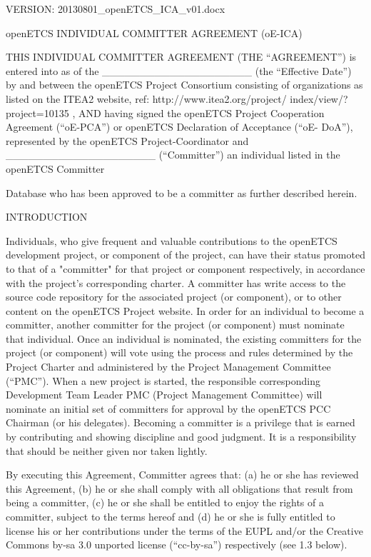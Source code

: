 VERSION: 20130801\_openETCS\_ICA\_v01.docx

openETCS INDIVIDUAL COMMITTER AGREEMENT (oE-ICA)

THIS INDIVIDUAL COMMITTER AGREEMENT (THE “AGREEMENT”) is entered into as of
the \_\_\_\_\_\_\_\_\_\_\_\_\_\_\_\_\_\_\_\_ (the “Effective Date”) by and between the openETCS Project
Consortium consisting of organizations as listed on the ITEA2 website, ref:
http://www.itea2.org/project/ index/view/?project=10135 , AND having signed the openETCS
Project Cooperation Agreement (“oE-PCA”) or openETCS Declaration of Acceptance (“oE-
DoA”), represented by the openETCS Project-Coordinator
and \_\_\_\_\_\_\_\_\_\_\_\_\_\_\_\_\_\_\_\_ (“Committer”) an individual listed in the openETCS Committer

Database who has been approved to be a committer as further described herein.

INTRODUCTION

Individuals, who give frequent and valuable contributions to the openETCS development
project, or component of the project, can have their status promoted to that of a "committer"
for that project or component respectively, in accordance with the project’s corresponding
charter. A committer has write access to the source code repository for the associated
project (or component), or to other content on the openETCS Project website. In order for an
individual to become a committer, another committer for the project (or component) must
nominate that individual. Once an individual is nominated, the existing committers for the
project (or component) will vote using the process and rules determined by the Project
Charter and administered by the Project Management Committee (“PMC”). When a new
project is started, the responsible corresponding Development Team Leader PMC (Project
Management Committee) will nominate an initial set of committers for approval by the
openETCS PCC Chairman (or his delegates). Becoming a committer is a privilege that is
earned by contributing and showing discipline and good judgment. It is a responsibility that
should be neither given nor taken lightly.

By executing this Agreement, Committer agrees that: (a) he or she has reviewed this
Agreement, (b) he or she shall comply with all obligations that result from being a committer,
(c) he or she shall be entitled to enjoy the rights of a committer, subject to the terms hereof
and (d) he or she is fully entitled to license his or her contributions under the terms of the
EUPL and/or the Creative Commons by-sa 3.0 unported license (“cc-by-sa”) respectively
(see 1.3 below).

